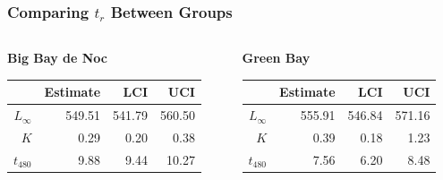 \documentclass[xcolor=dvipsnames]{beamer}\usepackage[]{graphicx}\usepackage[]{color}
\begin{document}
\begin{frame}[fragile, t]
\frametitle{Comparing $t_{r}$ Between Groups}
\begin{columns}
\begin{column}{0.5\textwidth}
\textbf{Big Bay de Noc}
\begin{table}[ht]
\centering
\begin{tabular}{rrrr}
  \hline
 & Estimate & LCI & UCI \\ 
  \hline
$L_{\infty}$ & 549.51 & 541.79 & 560.50 \\ 
  $K$ & 0.29 & 0.20 & 0.38 \\ 
   \rowcolor{light-gray}$t_{480}$ & 9.88 & 9.44 & 10.27 \\ 
   \hline
\end{tabular}
\end{table}

\end{column}
\begin{column}{0.5\textwidth}
\textbf{Green Bay}
\begin{table}[ht]
\centering
\begin{tabular}{rrrr}
  \hline
 & Estimate & LCI & UCI \\ 
  \hline
$L_{\infty}$ & 555.91 & 546.84 & 571.16 \\ 
  $K$ & 0.39 & 0.18 & 1.23 \\ 
   \rowcolor{light-gray}$t_{480}$ & 7.56 & 6.20 & 8.48 \\ 
   \hline
\end{tabular}
\end{table}

\end{column}
\end{columns}
\end{frame}
\end{document}
